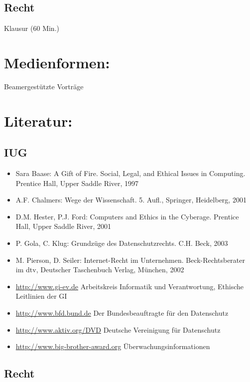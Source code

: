 \subsection*{Recht}\label{recht-1}

Klausur (60 Min.)

\section*{Medienformen:}\label{medienformen-9}

Beamergestützte Vorträge

\section*{Literatur:}\label{literatur-13}

\subsection*{IUG}\label{iug}

\begin{itemize}
\tightlist
\item
  Sara Baase: A Gift of Fire. Social, Legal, and Ethical Issues in
  Computing. Prentice Hall, Upper Saddle River, 1997
\item
  A.F. Chalmers: Wege der Wissenschaft. 5. Aufl., Springer, Heidelberg,
  2001
\item
  D.M. Hester, P.J. Ford: Computers and Ethics in the Cyberage. Prentice
  Hall, Upper Saddle River, 2001
\item
  P. Gola, C. Klug: Grundzüge des Datenschutzrechts. C.H. Beck, 2003
\item
  M. Pierson, D. Seiler: Internet-Recht im Unternehmen.
  Beck-Rechtsberater im dtv, Deutscher Taschenbuch Verlag, München, 2002
\item
  \url{http://www.gi-ev.de} Arbeitskreis Informatik und Verantwortung,
  Ethische Leitlinien der GI
\item
  \url{http://www.bfd.bund.de} Der Bundesbeauftragte für den Datenschutz
\item
  \url{http://www.aktiv.org/DVD} Deutsche Vereinigung für Datenschutz
\item
  \url{http://www.big-brother-award.org} Überwachungsinformationen
\end{itemize}

\subsection*{Recht}\label{recht-2}

